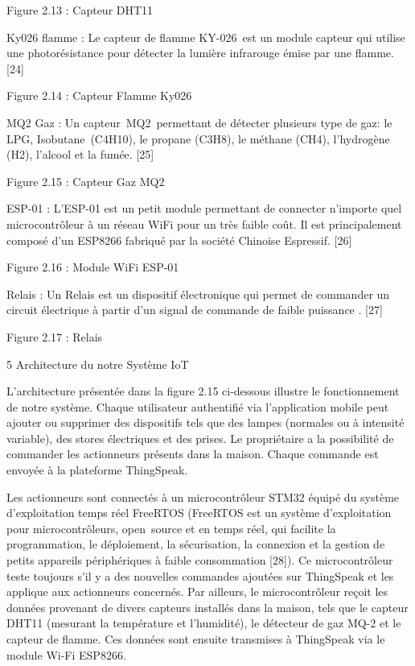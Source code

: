 \documentclass{article}
\begin{document}
Figure 2.13 : Capteur DHT11  

Ky026 flamme : Le capteur de flamme KY-026 est un module capteur qui utilise une photorésistance pour détecter la lumière infrarouge émise par une flamme. [24]

Figure 2.14 : Capteur Flamme Ky026

MQ2 Gaz : Un capteur MQ2 permettant de détecter plusieurs type de gaz: le LPG, Isobutane (C4H10), le propane (C3H8), le méthane (CH4), l'hydrogène (H2), l'alcool et la fumée. [25]

Figure 2.15 : Capteur Gaz MQ2

ESP-01 : L'ESP-01 est un petit module permettant de connecter n'importe quel microcontrôleur à un réseau WiFi pour un très faible coût. Il est principalement composé d'un ESP8266 fabriqué par la société Chinoise Espressif. [26]

Figure 2.16 : Module WiFi ESP-01

Relais : Un Relais est un dispositif électronique qui permet de commander un circuit électrique à partir d’un signal de commande de faible puissance . [27]

Figure 2.17 : Relais

5  Architecture  du  notre  Système  IoT 

L'architecture présentée dans la figure 2.15 ci-dessous illustre le fonctionnement de notre système. Chaque utilisateur authentifié via l'application mobile peut ajouter ou supprimer des dispositifs tels que des lampes (normales ou à intensité variable), des stores électriques et des prises. Le propriétaire a la possibilité de commander les actionneurs présents dans la maison. Chaque commande est envoyée à la plateforme ThingSpeak.

Les actionneurs sont connectés à un microcontrôleur STM32 équipé du système d'exploitation temps réel FreeRTOS (FreeRTOS est un système d'exploitation pour microcontrôleurs, open source et en temps réel, qui facilite la programmation, le déploiement, la sécurisation, la connexion et la gestion de petits appareils périphériques à faible consommation [28]). Ce microcontrôleur teste toujours s’il y a des nouvelles commandes ajoutées sur ThingSpeak et les applique aux actionneurs concernés. Par ailleurs, le microcontrôleur reçoit les données provenant de divers capteurs installés dans la maison, tels que le capteur DHT11 (mesurant la température et l'humidité), le détecteur de gaz MQ-2 et le capteur de flamme. Ces données sont ensuite transmises à ThingSpeak via le module Wi-Fi ESP8266.
\end{document}

